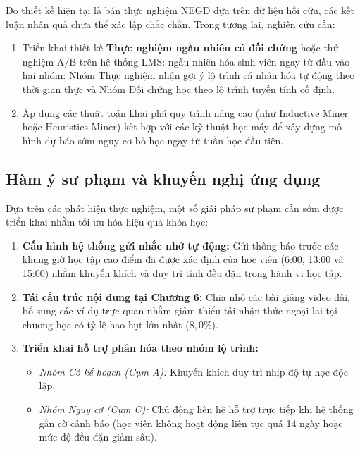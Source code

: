 Do thiết kế hiện tại là bán thực nghiệm NEGD dựa trên dữ liệu hồi cứu, các kết luận nhân quả chưa thể xác lập chắc chắn. Trong tương lai, nghiên cứu cần:
\begin{enumerate}
    \item Triển khai thiết kế \textbf{Thực nghiệm ngẫu nhiên có đối chứng} hoặc thử nghiệm A/B trên hệ thống LMS: ngẫu nhiên hóa sinh viên ngay từ đầu vào hai nhóm: Nhóm Thực nghiệm nhận gợi ý lộ trình cá nhân hóa tự động theo thời gian thực và Nhóm Đối chứng học theo lộ trình tuyến tính cố định.
    \item Áp dụng các thuật toán khai phá quy trình nâng cao (như Inductive Miner hoặc Heuristics Miner) kết hợp với các kỹ thuật học máy để xây dựng mô hình dự báo sớm nguy cơ bỏ học ngay từ tuần học đầu tiên.
\end{enumerate}

\subsection{Hàm ý sư phạm và khuyến nghị ứng dụng}

Dựa trên các phát hiện thực nghiệm, một số giải pháp sư phạm cần sớm được triển khai nhằm tối ưu hóa hiệu quả khóa học:
\begin{enumerate}
    \item \textbf{Cấu hình hệ thống gửi nhắc nhở tự động:} Gửi thông báo trước các khung giờ học tập cao điểm đã được xác định của học viên (6:00, 13:00 và 15:00) nhằm khuyến khích và duy trì tính đều đặn trong hành vi học tập.
    \item \textbf{Tái cấu trúc nội dung tại Chương 6:} Chia nhỏ các bài giảng video dài, bổ sung các ví dụ trực quan nhằm giảm thiểu tải nhận thức ngoại lai tại chương học có tỷ lệ hao hụt lớn nhất ($8,0\%$).
    \item \textbf{Triển khai hỗ trợ phân hóa theo nhóm lộ trình:}
    \begin{itemize}
        \item \textit{Nhóm Có kế hoạch (Cụm A):} Khuyến khích duy trì nhịp độ tự học độc lập.
        \item \textit{Nhóm Nguy cơ (Cụm C):} Chủ động liên hệ hỗ trợ trực tiếp khi hệ thống gắn cờ cảnh báo (học viên không hoạt động liên tục quá 14 ngày hoặc mức độ đều đặn giảm sâu).
    \end{itemize}
\end{enumerate}
